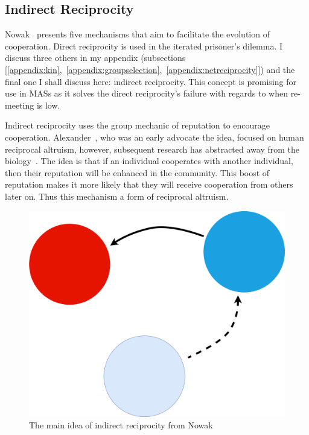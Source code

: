 \documentclass[]{final_report}
\begin{document}
\subsection{Indirect Reciprocity}
\label{sec:indir}
Nowak~\cite{five_rules_coop} presents five mechanisms that aim to facilitate the evolution of cooperation. Direct reciprocity is used in the iterated prisoner's dilemma. I discuss three others in my appendix (subsections [\ref{appendix:kin},~\ref{appendix:groupselection},~\ref{appendix:netreciprocity}]) and the final one I shall discuss here: indirect reciprocity. This concept is promising for use in MASs as it solves the direct reciprocity's failure with regards to when re-meeting is low.\par 
Indirect reciprocity uses the group mechanic of reputation to encourage cooperation. Alexander~\cite{alexander1987biology}, who was an early advocate the idea, focused on human reciprocal altruism, however, subsequent research has abstracted away from the biology~\cite{phelps_game_theoretic_analysis, imagevsstanding, evol_indirect_image, evoldirindir, five_rules_coop, leimarhammer, sugden2004economics, gossip_alt, mui2002computational}. The idea is that if an individual cooperates with another individual, then their reputation will be enhanced in the community. This boost of reputation makes it more likely that they will receive cooperation from others later on. Thus this mechanism a form of reciprocal altruism.\par
\begin{figure}
\vspace{-20pt}
\begin{framed}
	\center
	\includegraphics[width=\textwidth]{IndirectRec.png}
	\caption{The main idea of indirect reciprocity from Nowak~\cite{five_rules_coop}}
	\label{fig:indir_rec}
\end{framed}
\vspace{-30pt}
\end{figure}
\end{document}

